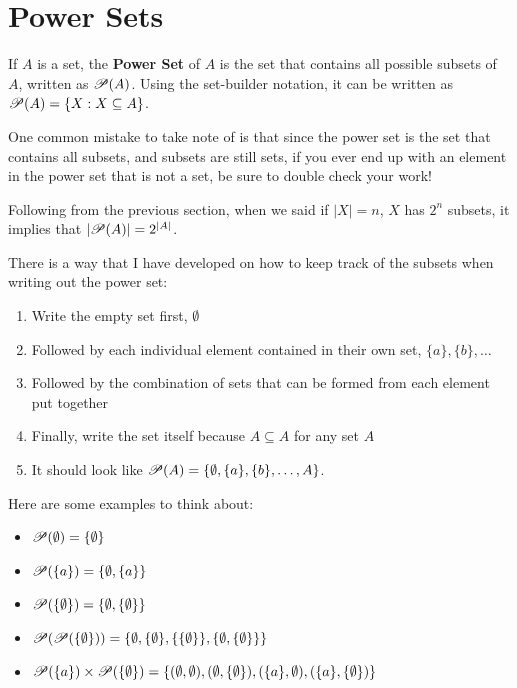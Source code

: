 \documentclass[../Latex-Setup/setup.tex]{subfiles}
\begin{document}
\section{Power Sets}

\indent If $A$ is a set, the \textbf{Power Set} of $A$ is the set that contains all possible subsets of $A$, written as $\mathscr P(A)$.
Using the set-builder notation, it can be written as $\mathscr P(A) = \{X : X \subseteq A\}$.\par

\indent One common mistake to take note of is that since the power set is the set that contains all subsets, and subsets are still sets,
if you ever end up with an element in the power set that is not a set, be sure to double check your work!\par

\indent Following from the previous section, when we said if $|X| = n$, $X$ has $2^n$ subsets,
it implies that $|\mathscr P(A)| = 2^{|A|}$.\par

\indent There is a way that I have developed on how to keep track of the subsets when writing out the power set:
\begin{enumerate}
    \item Write the empty set first, $\emptyset$
    \item Followed by each individual element contained in their own set, $\{a\}, \{b\}, \dots$
    \item Followed by the combination of sets that can be formed from each element put together
    \item Finally, write the set itself because $A \subseteq A$ for any set $A$
    \item It should look like $\mathscr P(A) = \{\emptyset, \{a\}, \{b\}, \dots, A\}$.
\end{enumerate}
\par

\begin{example}
    Here are some examples to think about:
    \begin{itemize}
        \item $\mathscr P(\emptyset)=\{\emptyset\}$
        \item $\mathscr P(\{a\})=\{\emptyset, \{a\}\}$
        \item $\mathscr P(\{\emptyset\}) = \{\emptyset, \{\emptyset\}\}$
        \item $\mathscr P(\mathscr P(\{\emptyset\}))=\{\emptyset, \{\emptyset\}, \{\{\emptyset\}\}, \{\emptyset, \{\emptyset\}\}\}$
        \item $\mathscr P(\{a\}) \times \mathscr P(\{\emptyset\}) = \{(\emptyset, \emptyset), (\emptyset, \{\emptyset\}), (\{a\}, \emptyset), (\{a\}, \{\emptyset\})\}$
    \end{itemize}
\end{example}
\end{document}
